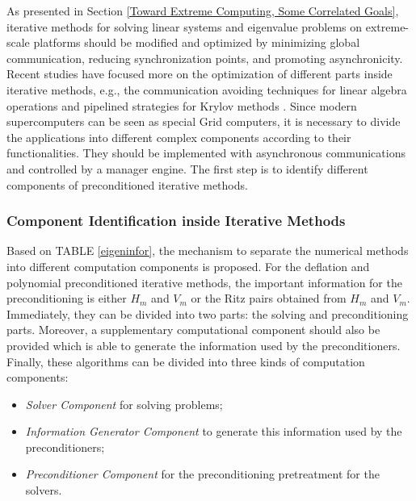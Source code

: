 As presented in Section \ref{Toward Extreme Computing, Some Correlated Goals}, iterative methods for solving linear systems and eigenvalue problems on extreme-scale platforms should be modified and optimized by minimizing global communication, reducing synchronization points, and promoting asynchronicity. Recent studies have focused more on the optimization of different parts inside iterative methods, e.g., the communication avoiding techniques for linear algebra operations \cite{hoemmen2010communication, carson2015communication} and pipelined strategies for Krylov methods \cite{morgan2016stochastic, cools2017communication}. Since modern supercomputers can be seen as special Grid computers, it is necessary to divide the applications into different complex components according to their functionalities. They should be implemented with asynchronous communications and controlled by a manager engine. The first step is to identify different components of preconditioned iterative methods.

\subsubsection{Component Identification inside Iterative Methods}

Based on TABLE \ref{eigeninfor}, the mechanism to separate the numerical methods into different computation components is proposed. For the deflation and polynomial preconditioned iterative methods, the important information for the preconditioning is either $H_m$ and $V_m$ or the Ritz pairs obtained from $H_m$ and $V_m$.  Immediately, they can be divided into two parts: the solving and preconditioning parts. Moreover, a supplementary computational component should also be provided which is able to generate the information used by the preconditioners. Finally, these algorithms can be divided into three kinds of computation components:

\begin{itemize}
	\item \textit{Solver Component} for solving problems;
	\item \textit{Information Generator Component} to generate this information used by the preconditioners;
	\item \textit{Preconditioner Component} for the preconditioning pretreatment for the solvers.
\end{itemize}

